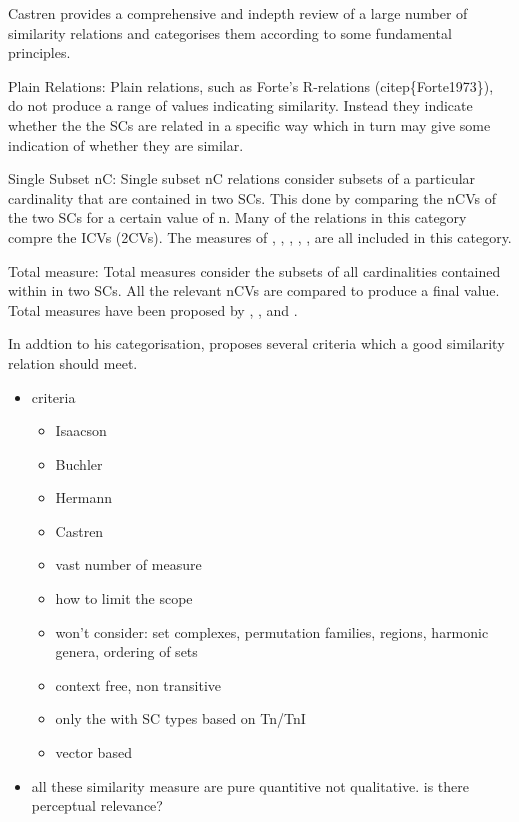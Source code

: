 \documentclass{article}
\begin{document}
Castren provides a comprehensive and indepth review of a large number
of similarity relations and categorises them according to some
fundamental principles.

Plain Relations: Plain relations, such as Forte's R-relations
(citep\{Forte1973\}), do not produce a range of values indicating
similarity. Instead they indicate whether the the SCs are related in a
specific way which in turn may give some indication of whether they
are similar.

Single Subset nC: Single subset nC relations consider subsets of a
particular cardinality that are contained in two SCs. This done by
comparing the nCVs of the two SCs for a certain value of n. Many of
the relations in this category compre the ICVs (2CVs). The measures of
\citep{Morris1979}, \citep{Teitelbaum1965}, \citep{Lord1981},
\citep{Isaacson1990}, \citep{Rahn1979}, \citep{Rogers1999} are all
included in this category.

Total measure: Total measures consider the subsets of all
cardinalities contained within in two SCs. All the relevant nCVs are
compared to produce a final value. Total measures have been proposed
by \citep{Rahn1979}, \citep{Lewin1979}, \citep{Castren1994} and
\citep{Buchler1997}.

In addtion to his categorisation, \citep{Castren1994} proposes several
criteria which a good similarity relation should meet.

\begin{itemize}
\item criteria
\begin{itemize}
\item Isaacson
\item Buchler
\item Hermann
\item Castren
\item vast number of measure
\item how to limit the scope
\item won't consider: set complexes, permutation families, regions,
    harmonic genera, ordering of sets
\item context free, non transitive
\item only the with SC types based on Tn/TnI
\item vector based
\end{itemize}
\item all these similarity measure are pure quantitive not qualitative. is
  there perceptual relevance?
\end{itemize}
\end{document}
